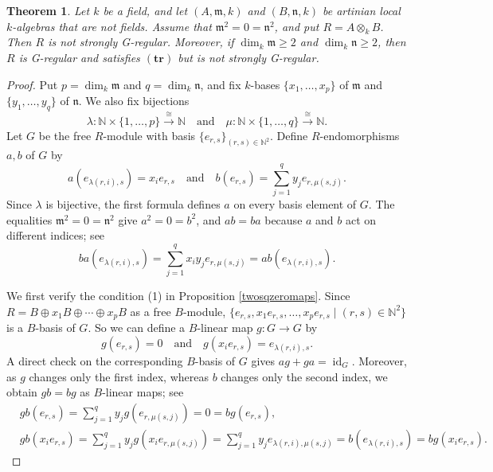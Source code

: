 \documentclass{amsart}
\newtheorem{thm}{Theorem}[section]
\theoremstyle{definition}
\theoremstyle{remark}
\numberwithin{equation}{thm}
\def\ge{\geqslant}
\def\id{\operatorname{id}}
\def\m{\mathfrak{m}}
\def\n{\mathfrak{n}}
\def\TR{(\mathbf{tr})}
\begin{document}
\begin{thm}\label{hanrei}
Let $k$ be a field, and let $(A,\m,k)$ and $(B,\n,k)$ be artinian local $k$-algebras that are not fields. Assume that $\m^2=0=\n^2$, and put $R=A\otimes_kB$. Then $R$ is not strongly G-regular. Moreover, if $\dim_k\m\ge2$ and $\dim_k\n\ge2$, then $R$ is G-regular and satisfies $\TR$ but is not strongly G-regular.
\end{thm}

\begin{proof}
Put $p=\dim_k\m$ and $q=\dim_k\n$, and fix $k$-bases $\{x_1,\ldots,x_p\}$ of $\m$ and $\{y_1,\ldots,y_q\}$ of $\n$. We also fix bijections
$$
\lambda:\mathbb{N}\times\{1,\ldots,p\}\xrightarrow{\cong}\mathbb{N}
\quad\text{and}\quad
\mu:\mathbb{N}\times\{1,\ldots,q\}\xrightarrow{\cong}\mathbb{N}.
$$
Let $G$ be the free $R$-module with basis $\{e_{r,s}\}_{(r,s)\in\mathbb{N}^2}$.
Define $R$-endomorphisms $a,b$ of $G$ by
$$
a(e_{\lambda(r,i),s})=x_ie_{r,s}
\quad\text{and}\quad
b(e_{r,s})=\sum_{j=1}^q y_je_{r,\mu(s,j)}.
$$
Since $\lambda$ is bijective, the first formula defines $a$ on every basis element of $G$. The equalities $\m^2=0=\n^2$ give $a^2=0=b^2$, and $ab=ba$ because $a$ and $b$ act on different indices; see
$$
ba(e_{\lambda(r,i),s})=\sum_{j=1}^q x_iy_je_{r,\mu(s,j)}=ab(e_{\lambda(r,i),s}).
$$

We first verify the condition (1) in Proposition \ref{twosqzeromaps}. Since $R=B\oplus x_1B\oplus\cdots\oplus x_pB$ as a free $B$-module, 
$\{e_{r,s}, x_1e_{r,s}, \ldots, x_pe_{r,s} \mid (r,s)\in\mathbb{N}^2\}$ is a $B$-basis of $G$. So we can define a $B$-linear map $g:G\to G$ by 
$$
g(e_{r,s})=0
\quad\text{and}\quad
g(x_ie_{r,s})=e_{\lambda(r,i),s}.
$$
A direct check on the corresponding $B$-basis of $G$ gives $ag+ga=\id_G$.
Moreover, as $g$ changes only the first index, whereas $b$ changes only the second index, we obtain $gb=bg$ as $B$-linear maps; see
\begin{align*}
&gb(e_{r,s})=\sum_{j=1}^q y_j g(e_{r,\mu(s,j)})=0=bg(e_{r,s}), \\
&gb(x_ie_{r,s})=\sum_{j=1}^q y_j g(x_ie_{r,\mu(s,j)})=\sum_{j=1}^q y_je_{\lambda(r,i),\mu(s,j)}=b(e_{\lambda(r,i),s})=bg(x_ie_{r,s}).
\end{align*}


\end{proof}
\end{document}
